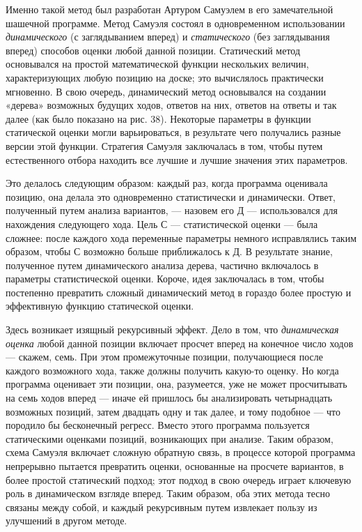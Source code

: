 \documentclass[../main.tex]{subfiles}
\begin{document}
Именно такой метод был разработан Артуром Самуэлем в его замечательной шашечной программе. Метод Самуэля состоял в одновременном использовании \emph{динамического} (с заглядыванием вперед) и \emph{статического} (без заглядывания вперед) способов оценки любой данной позиции. Статический метод основывался на простой математической функции нескольких величин, характеризующих любую позицию на доске; это вычислялось практически мгновенно. В свою очередь, динамический метод основывался на создании «дерева» возможных будущих ходов, ответов на них, ответов на ответы и так далее (как было показано на рис. 38). Некоторые параметры в функции статической оценки могли варьироваться, в результате чего получались разные версии этой функции. Стратегия Самуэля заключалась в том, чтобы путем естественного отбора находить все лучшие и лучшие значения этих параметров.

Это делалось следующим образом: каждый раз, когда программа оценивала позицию, она делала это одновременно статистически и динамически. Ответ, полученный путем анализа вариантов, --- назовем его Д --- использовался для нахождения следующего хода. Цель С --- статистической оценки --- была сложнее: после каждого хода переменные параметры немного исправлялись таким образом, чтобы С возможно больше приближалось к Д. В результате знание, полученное путем динамического анализа дерева, частично включалось в параметры статистической оценки. Короче, идея заключалась в том, чтобы постепенно превратить сложный динамический метод в гораздо более простую и эффективную функцию статической оценки.

Здесь возникает изящный рекурсивный эффект. Дело в том, что \emph{динамическая оценка} любой данной позиции включает просчет вперед на конечное число ходов --- скажем, семь. При этом промежуточные позиции, получающиеся после каждого возможного хода, также должны получить какую-то оценку. Но когда программа оценивает эти позиции, она, разумеется, уже не может просчитывать на семь ходов вперед --- иначе ей пришлось бы анализировать четырнадцать возможных позиций, затем двадцать одну и так далее, и тому подобное --- что породило бы бесконечный регресс. Вместо этого программа пользуется статическими оценками позиций, возникающих при анализе. Таким образом, схема Самуэля включает сложную обратную связь, в процессе которой программа непрерывно пытается превратить оценки, основанные на просчете вариантов, в более простой статический подход; этот подход в свою очередь играет ключевую роль в динамическом взгляде вперед. Таким образом, оба этих метода тесно связаны между собой, и каждый рекурсивным путем извлекает пользу из улучшений в другом методе.
\end{document}
